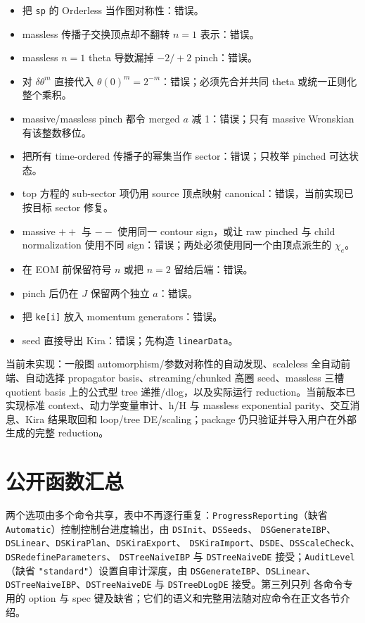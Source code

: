﻿\documentclass[a4paper,11pt]{article}
\begin{document}
\begin{itemize}
  \item 把 \texttt{sp} 的 Orderless 当作图对称性：错误。
  \item massless 传播子交换顶点却不翻转 $n=1$ 表示：错误。
  \item massless $n=1$ theta 导数漏掉 $-2/+2$ pinch：错误。
  \item 对 $\delta\theta^m$ 直接代入 $\theta(0)^m=2^{-m}$：错误；必须先合并共同 theta 或统一正则化整个乘积。
  \item massive/massless pinch 都令 merged $a$ 减 1：错误；只有 massive Wronskian 有该整数移位。
  \item 把所有 time-ordered 传播子的幂集当作 sector：错误；只枚举 pinched 可达状态。
  \item top 方程的 sub-sector 项仍用 source 顶点映射 canonical：错误，当前实现已按目标 sector 修复。
  \item massive $++$ 与 $--$ 使用同一 contour sign，或让 raw pinched 与 child normalization 使用不同 sign：错误；两处必须使用同一个由顶点派生的 $\chi_e$。
  \item 在 EOM 前保留符号 $n$ 或把 $n=2$ 留给后端：错误。
  \item pinch 后仍在 $J$ 保留两个独立 $a$：错误。
  \item 把 \texttt{ke[i]} 放入 momentum generators：错误。
  \item seed 直接导出 Kira：错误；先构造 \texttt{linearData}。
\end{itemize}

当前未实现：一般图 automorphism/参数对称性的自动发现、scaleless 全自动前端、自动选择 propagator basis、streaming/chunked 高圈 seed、massless 三槽 quotient basis 上的公式型 tree 递推/dlog，以及实际运行 reduction。当前版本已实现标准 context、动力学变量审计、h/H 与 massless exponential parity、交互消息、Kira 结果取回和 loop/tree DE/scaling；package 仍只验证并导入用户在外部生成的完整 reduction。

\appendix
\section{公开函数汇总}

两个选项由多个命令共享，表中不再逐行重复：\texttt{ProgressReporting}（缺省
\texttt{Automatic}）控制控制台进度输出，由 \texttt{DSInit}、\allowbreak\texttt{DSSeeds}、\allowbreak
\texttt{DSGenerateIBP}、\allowbreak\texttt{DSLinear}、\allowbreak\texttt{DSKiraPlan}、\allowbreak\texttt{DSKiraExport}、\allowbreak
\texttt{DSKiraImport}、\allowbreak\texttt{DSDE}、\allowbreak\texttt{DSScaleCheck}、\allowbreak\texttt{DSRedefineParameters}、\allowbreak
\texttt{DSTreeNaiveIBP} 与 \texttt{DSTreeNaiveDE} 接受；\texttt{AuditLevel}（缺省
\texttt{"standard"}）设置自审计深度，由 \texttt{DSGenerateIBP}、\allowbreak\texttt{DSLinear}、\allowbreak
\texttt{DSTreeNaiveIBP}、\allowbreak\texttt{DSTreeNaiveDE} 与 \texttt{DSTreeDLogDE} 接受。第三列只列
各命令专用的 option 与 spec 键及缺省；它们的语义和完整用法随对应命令在正文各节介绍。
\end{document}
